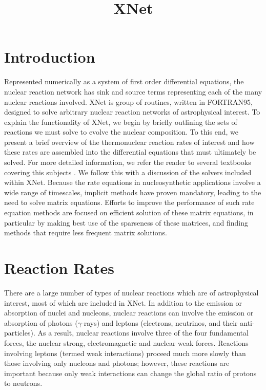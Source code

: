 \documentclass[12pt,modern,tighten,times,apj]{aastex61}
\begin{document}
\title{XNet}

\section{Introduction}

Represented numerically as a system of first order differential equations, the nuclear reaction network has sink and source terms representing each of the many nuclear reactions involved. 
XNet is group of routines, written in FORTRAN95, designed to solve arbitrary nuclear reaction networks of astrophysical interest. 
To explain the functionality of XNet, we begin by briefly outlining the sets of reactions we must solve to evolve the nuclear composition.  
To this end, we present a brief overview of the thermonuclear reaction rates of interest and how these rates are assembled into the differential equations that must ultimately be solved.
For more detailed information, we refer the reader to several textbooks covering this subjects \cite{Clay83,RoRo88,Arne96}.  
We follow this with a discussion of the solvers included within XNet.
Because the rate equations in nucleosynthetic applications involve a wide range of timescales, implicit methods have proven mandatory, leading to the need to solve matrix equations. 
Efforts to improve the performance of such rate equation methods are focused on efficient solution of these matrix equations, in particular by making best use of the sparseness of these matrices, and finding methods that require less frequent matrix solutions.  

\section{Reaction Rates}\label{sect:reacrate}

There are a large number of types of nuclear reactions which are of astrophysical interest, most of which are included in XNet.  
In addition to the emission or absorption of  nuclei and nucleons, nuclear reactions can involve the emission or  absorption of photons ($\gamma$-rays) and leptons (electrons, neutrinos,  and their anti-particles).  
As a result, nuclear reactions involve three of the  four fundamental forces, the nuclear strong, electromagnetic and nuclear weak forces.  
Reactions involving leptons (termed weak interactions) proceed  much more slowly than those involving only nucleons and photons;  however,  these reactions are important because only weak interactions can change the global ratio of protons to neutrons.
\end{document}
